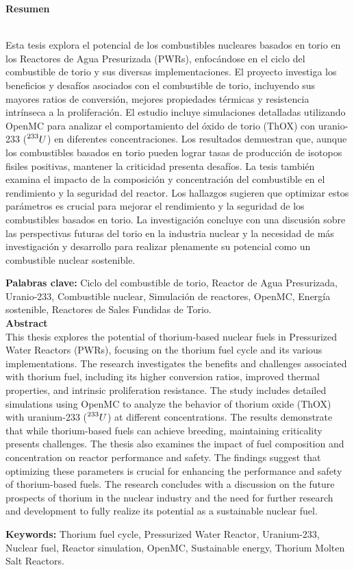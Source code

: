\textbf{\LARGE Resumen}
\\
Esta tesis explora el potencial de los combustibles nucleares basados en torio en los Reactores de Agua Presurizada (PWRs), enfocándose en el ciclo del combustible de torio y sus diversas implementaciones. El proyecto investiga los beneficios y desafíos asociados con el combustible de torio, incluyendo sus mayores ratios de conversión, mejores propiedades térmicas y resistencia intrínseca a la proliferación. El estudio incluye simulaciones detalladas utilizando OpenMC para analizar el comportamiento del óxido de torio (ThOX) con uranio-233 (\(\prescript{233}{}{U}\)) en diferentes concentraciones. Los resultados demuestran que, aunque los combustibles basados en torio pueden lograr tasas de producción de isotopos fisiles positivas, mantener la criticidad presenta desafíos. La tesis también examina el impacto de la composición y concentración del combustible en el rendimiento y la seguridad del reactor. Los hallazgos sugieren que optimizar estos parámetros es crucial para mejorar el rendimiento y la seguridad de los combustibles basados en torio. La investigación concluye con una discusión sobre las perspectivas futuras del torio en la industria nuclear y la necesidad de más investigación y desarrollo para realizar plenamente su potencial como un combustible nuclear sostenible.

\vspace{1.0cm}

\textbf{\small Palabras clave:} Ciclo del combustible de torio, Reactor de Agua Presurizada, Uranio-233, Combustible nuclear, Simulación de reactores, OpenMC, Energía sostenible, Reactores de Sales Fundidas de Torio.\\

\newpage
\textbf{\LARGE Abstract}\\

This thesis explores the potential of thorium-based nuclear fuels in Pressurized Water Reactors (PWRs), focusing on the thorium fuel cycle and its various implementations. The research investigates the benefits and challenges associated with thorium fuel, including its higher conversion ratios, improved thermal properties, and intrinsic proliferation resistance. The study includes detailed simulations using OpenMC to analyze the behavior of thorium oxide (ThOX) with uranium-233 (\(\prescript{233}{}{U}\)) at different concentrations. The results demonstrate that while thorium-based fuels can achieve breeding, maintaining criticality presents challenges. The thesis also examines the impact of fuel composition and concentration on reactor performance and safety. The findings suggest that optimizing these parameters is crucial for enhancing the performance and safety of thorium-based fuels. The research concludes with a discussion on the future prospects of thorium in the nuclear industry and the need for further research and development to fully realize its potential as a sustainable nuclear fuel.

\vspace{1.0cm}

\textbf{\small Keywords:} Thorium fuel cycle, Pressurized Water Reactor, Uranium-233, Nuclear fuel, Reactor simulation, OpenMC, Sustainable energy, Thorium Molten Salt Reactors.\\